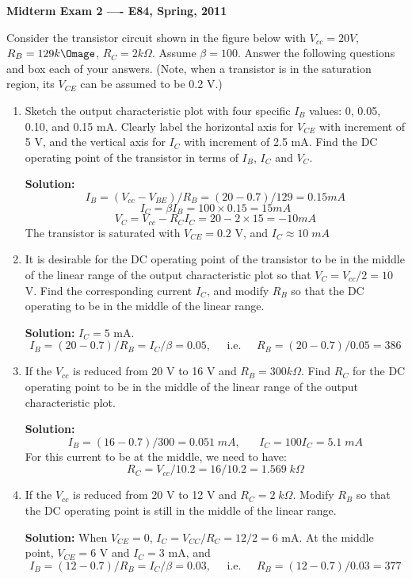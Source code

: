 \usepackage{html}

\begin{center}
{\Large \bf  Midterm Exam 2 ---- E84, Spring, 2011}
\end{center}

Consider the transistor circuit shown in the figure below with 
$V_{cc}=20V$, $R_B=129k\Omage$, $R_C=2k\Omega$. Assume $\beta=100$.
Answer the following questions and box each of your answers.
(Note, when a transistor is in the saturation region, its $V_{CE}$
can be assumed to be 0.2 V.)


\begin{enumerate}
\item Sketch the output characteristic plot with four specific $I_B$
  values: 0, 0.05, 0.10, and 0.15 mA. Clearly label the horizontal
  axis for $V_{CE}$ with increment of 5 V, and the vertical axis for
  $I_C$ with increment of 2.5 mA.
  Find the DC operating point of the transistor in terms of $I_B$, 
  $I_C$ and $V_C$. 

  {\bf Solution:}  
  \[ I_B=(V_{cc}-V_{BE})/R_B=(20-0.7)/129=0.15 mA \]
  \[ I_C=\beta I_B=100\times 0.15=15 mA \]
  \[ V_C=V_{cc}-R_CI_C=20-2\times 15=-10 mA \]
  The transistor is saturated with $V_{CE}=0.2$ V, and $I_C\approx 10\;mA$

\item It is desirable for the DC operating point of the transistor to be 
  in the middle of the linear range of the output characteristic plot so
  that $V_C=V_{cc}/2=10$ V. Find the corresponding current $I_C$, and modify 
  $R_B$ so that the DC operating to be in the middle of the linear range.

  {\bf Solution:} $I_C=5$ mA.
  \[ I_B=(20-0.7)/R_B=I_C/\beta=0.05,\;\;\;\;\;\mbox{i.e.}\;\;\;\;\;
  R_B=(20-0.7)/0.05=386 \]

\item If the $V_{cc}$ is reduced from 20 V to 16 V and $R_B=300k\Omega$.
  Find $R_C$ for the DC operating point to be in the middle of the 
  linear range of the output characteristic plot. 

  {\bf Solution:}
  \[ I_B=(16-0.7)/300=0.051\;mA,\;\;\;\;\;\;I_C=100 I_C=5.1\;mA \]
  For this current to be at the middle, we need to have:
  \[ R_C=V_{cc}/10.2=16/10.2=1.569\;k\Omega \]  

\item If the $V_{cc}$ is reduced from 20 V to 12 V and $R_C=2\;k\Omega$.
  Modify $R_B$ so that the DC operating point is still in the middle of 
  the linear range.

  {\bf Solution:} When $V_{CE}=0$, $I_C=V_{CC}/R_C=12/2=6$ mA. At the middle
  point, $V_{CE}=6$ V and $I_C=3$ mA, and 
  \[ I_B=(12-0.7)/R_B=I_C/\beta=0.03,\;\;\;\;\;\mbox{i.e.}\;\;\;\;\;
  R_B=(12-0.7)/0.03=377 \]

\end{enumerate}


